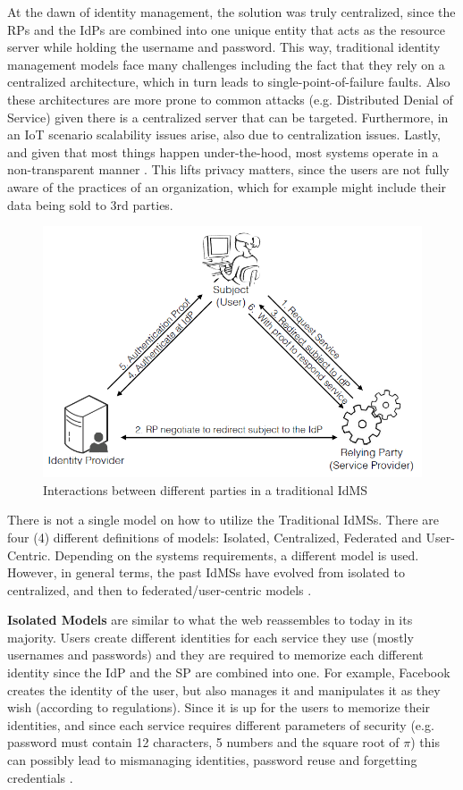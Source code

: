 At the dawn of identity management, the solution was truly centralized, since the RPs and the IdPs are combined into one unique entity that acts as the resource server while holding the username and password. This way, traditional identity management models face many challenges including the fact that they rely on a centralized architecture, which in turn leads to single-point-of-failure faults. Also these architectures are more prone to common attacks (e.g. Distributed Denial of Service) given there is a centralized server that can be targeted. Furthermore, in an IoT scenario scalability issues arise, also due to centralization issues. Lastly, and given that most things happen under-the-hood, most systems operate in a non-transparent manner \cite{gebresilassie2020distributed}. This lifts privacy matters, since the users are not fully aware of the practices of an organization, which for example might include their data being sold to 3rd parties.

\begin{figure}[!ht]
    \centering
    \includegraphics[width=0.6\linewidth]{images/simplified_traditional_IdMS.png}
    \caption[Interactions between different parties in a traditional IdMS]{Interactions between different parties in a traditional IdMS \cite{zhu2018identity}}
    \label{fig:interactions_between_different_parties}
\end{figure}

There is not a single model on how to utilize the Traditional IdMSs. There are four (4) different definitions of models: Isolated, Centralized, Federated and User-Centric. Depending on the systems requirements, a different model is used. However, in general terms, the past IdMSs have evolved from isolated to centralized, and then to federated/user-centric models \cite{JosangAuscertconference}.

\textbf{Isolated Models} are similar to what the web reassembles to today in its majority. Users create different identities for each service they use (mostly usernames and passwords) and they are required to memorize each different identity since the IdP and the SP are combined into one. For example, Facebook creates the identity of the user, but also manages it and manipulates it as they wish (according to regulations).
Since it is up for the users to memorize their identities, and since each service requires different parameters of security (e.g. password must contain 12 characters, 5 numbers and the square root of $\pi$) this can possibly lead to mismanaging identities, password reuse and forgetting credentials \cite{gebresilassie2020distributed}. 


